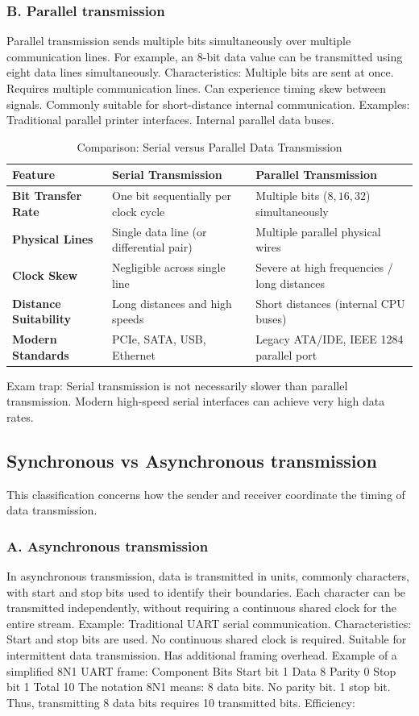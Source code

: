 \subsubsection{B. Parallel transmission}
Parallel transmission sends multiple bits simultaneously over multiple communication lines.
For example, an 8-bit data value can be transmitted using eight data lines simultaneously.
Characteristics:
Multiple bits are sent at once.
Requires multiple communication lines.
Can experience timing skew between signals.
Commonly suitable for short-distance internal communication.
Examples:
Traditional parallel printer interfaces.
Internal parallel data buses.
\begin{table}[htbp]
\centering
\caption{Comparison: Serial versus Parallel Data Transmission}
\label{tab:serial_vs_parallel}
\begin{tabularx}{\textwidth}{p{3.8cm} X X}
\toprule
\textbf{Feature} & \textbf{Serial Transmission} & \textbf{Parallel Transmission} \\
\midrule
\textbf{Bit Transfer Rate} & One bit sequentially per clock cycle & Multiple bits ($8, 16, 32$) simultaneously \\
\textbf{Physical Lines} & Single data line (or differential pair) & Multiple parallel physical wires \\
\textbf{Clock Skew} & Negligible across single line & Severe at high frequencies / long distances \\
\textbf{Distance Suitability} & Long distances and high speeds & Short distances (internal CPU buses) \\
\textbf{Modern Standards} & PCIe, SATA, USB, Ethernet & Legacy ATA/IDE, IEEE 1284 parallel port \\
\bottomrule
\end{tabularx}
\end{table}
Exam trap: Serial transmission is not necessarily slower than parallel transmission. Modern high-speed serial interfaces can achieve very high data rates.
\subsection{Synchronous vs Asynchronous transmission}
This classification concerns how the sender and receiver coordinate the timing of data transmission.
\subsubsection{A. Asynchronous transmission}
In asynchronous transmission, data is transmitted in units, commonly characters, with start and stop bits used to identify their boundaries.
Each character can be transmitted independently, without requiring a continuous shared clock for the entire stream.
Example: Traditional UART serial communication.
Characteristics:
Start and stop bits are used.
No continuous shared clock is required.
Suitable for intermittent data transmission.
Has additional framing overhead.
Example of a simplified 8N1 UART frame:
Component
Bits
Start bit
1
Data
8
Parity
0
Stop bit
1
Total
10
The notation 8N1 means:
8 data bits.
No parity bit.
1 stop bit.
Thus, transmitting 8 data bits requires 10 transmitted bits.
Efficiency:

